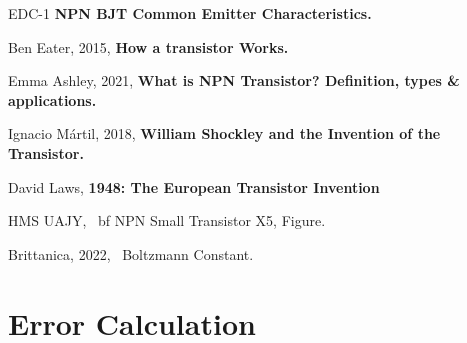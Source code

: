 \documentclass[10pt,letterpaper,onecolumn]{article}
\begin{document}
\begin{thebibliography}{9}

 EDC-1
{\bf NPN BJT Common Emitter Characteristics.}

Ben Eater, 2015, {\bf How a transistor Works.}

Emma Ashley, 2021, {\bf What is NPN Transistor? Definition, types \& applications.}

Ignacio Mártil, 2018, {\bf William Shockley and the Invention of the Transistor.}

David Laws, {\bf 1948: The European Transistor Invention}

HMS UAJY, {\ bf NPN Small Transistor X5}, Figure.

Brittanica, 2022, {\ Boltzmann Constant}.


\end{thebibliography}

\appendixpage
\section{Error Calculation}
\end{document}
